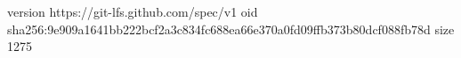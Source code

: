 version https://git-lfs.github.com/spec/v1
oid sha256:9e909a1641bb222bcf2a3c834fc688ea66e370a0fd09ffb373b80dcf088fb78d
size 1275
